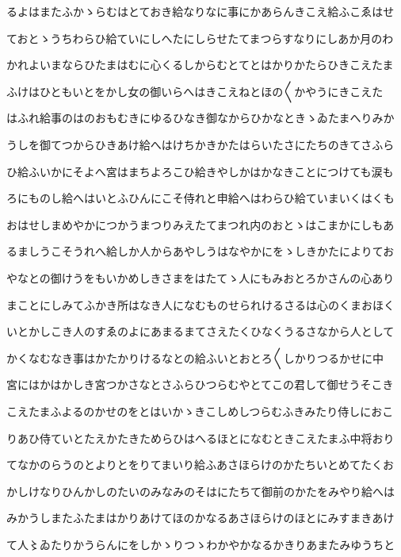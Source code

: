 \documentclass[a4paper,11pt,landscape]{ltjtarticle}
\begin{document}
\par\medskip
るよはまたふかゝらむはとておき給なりなに事にかあらんきこえ給ふこゑはせ
\par\medskip
ておとゝうちわらひ給ていにしへたにしらせたてまつらすなりにしあか月のわ
\par\medskip
かれよいまならひたまはむに心くるしからむとてとはかりかたらひきこえたま
\par\medskip
ふけはひともいとをかし女の御いらへはきこえねとほの〱かやうにきこえた
\par\medskip
はふれ給事のはのおもむきにゆるひなき御なからひかなときゝゐたまへりみか
\par\medskip
うしを御てつからひきあけ給へはけちかきかたはらいたさにたちのきてさふら
\par\medskip
ひ給ふいかにそよへ宮はまちよろこひ給きやしかはかなきことにつけても涙も
\par\medskip
ろにものし給へはいとふひんにこそ侍れと申給へはわらひ給ていまいくはくも
\par\medskip
おはせしまめやかにつかうまつりみえたてまつれ内のおとゝはこまかにしもあ
\par\medskip
るましうこそうれへ給しか人からあやしうはなやかにをゝしきかたによりてお
\par\medskip
やなとの御けうをもいかめしきさまをはたてゝ人にもみおとろかさんの心あり
\par\medskip
まことにしみてふかき所はなき人になむものせられけるさるは心のくまおほく
\par\medskip
いとかしこき人のすゑのよにあまるまてさえたくひなくうるさなから人として
\par\medskip
かくなむなき事はかたかりけるなとの給ふいとおとろ〱しかりつるかせに中
\par\medskip
宮にはかはかしき宮つかさなとさふらひつらむやとてこの君して御せうそこき
\par\medskip
こえたまふよるのかせのをとはいかゝきこしめしつらむふきみたり侍しにおこ
\par\medskip
りあひ侍ていとたえかたきためらひはへるほとになむときこえたまふ中将おり
\par\medskip
てなかのらうのとよりとをりてまいり給ふあさほらけのかたちいとめてたくお
\par\medskip
かしけなりひんかしのたいのみなみのそはにたちて御前のかたをみやり給へは
\par\medskip
みかうしまたふたまはかりあけてほのかなるあさほらけのほとにみすまきあけ
\par\medskip
て人〻ゐたりかうらんにをしかゝりつゝわかやかなるかきりあまたみゆうちと
\end{document}

